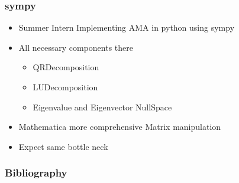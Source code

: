 \documentclass[tikz]{beamer}
\begin{document}
\begin{frame}
  \frametitle{sympy}
  
  \begin{itemize}
  \item Summer Intern Implementing AMA in python using sympy
  \item All necessary components there
    \begin{itemize}
    \item QRDecomposition
    \item LUDecomposition
    \item Eigenvalue and Eigenvector  NullSpace
    \end{itemize}
  \item Mathematica more comprehensive Matrix manipulation
  \item Expect same bottle neck
  \end{itemize}
\end{frame}




\begin{frame}
  \frametitle{Bibliography}
  


\end{frame}



\end{document}
